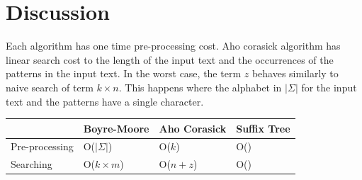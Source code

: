 \documentclass[paper=a4, fontsize=11pt]{scrartcl} %
\numberwithin{equation}{section} %
\numberwithin{figure}{section} %
\numberwithin{table}{section} %
\begin{document}
\newpage
\section{Discussion}
Each algorithm has one time pre-processing cost. Aho corasick algorithm has linear search cost to the length of the input text and the occurrences of the patterns in the input text. In the worst case, the term $z$ behaves similarly to naive search of term $k\times n$. This happens where the alphabet in $|\Sigma|$ for the input text and the patterns have a single character.

\begin{center}
	\begin{tabular}{| l | l | l | l |}
		\hline
		& Boyre-Moore & Aho Corasick & Suffix Tree \\
		\hline
		Pre-processing & O($|\Sigma|$) & O($k$) & O() \\
		\hline
		Searching & O($k\times m$) & O($n + z$) & O() \\
		\hline
	\end{tabular}
\end{center}

\newpage

\nocite{*}
\end{document}
